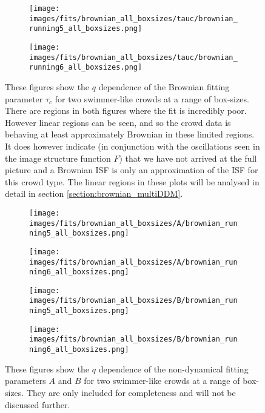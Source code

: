 \documentclass[10pt]{article}
\begin{document}
\begin{figure}[H]
\begin{subfigure}[t]{.5\textwidth}
  \centering
 \texttt{[image: images/fits/brownian\_all\_boxsizes/tauc/brownian\_running5\_all\_boxsizes.png]}
  \caption{}
\end{subfigure}%
\hfill
\begin{subfigure}[t]{.5\textwidth}
  \centering
  \texttt{[image: images/fits/brownian\_all\_boxsizes/tauc/brownian\_running6\_all\_boxsizes.png]}
  \caption{}
\end{subfigure}
\caption{These figures show the $q$ dependence of the Brownian fitting parameter $\tau_c$ for two swimmer-like crowds at a range of box-sizes. There are regions in both figures where the fit is incredibly poor. However linear regions can be seen, and so the crowd data is behaving at least approximately Brownian in these limited regions. It does however indicate (in conjunction with the oscillations seen in the image structure function $F$) that we have not arrived at the full picture and a Brownian ISF is only an approximation of the ISF for this crowd type. The linear regions in these plots will be analysed in detail in section \ref{section:brownian_multiDDM}.}
\label{fig:running_brownian_fits_tauc_all_boxsizes}
\end{figure}

\begin{figure}[H]
\begin{subfigure}[t]{.5\textwidth}
  \centering
 \texttt{[image: images/fits/brownian\_all\_boxsizes/A/brownian\_running5\_all\_boxsizes.png]}
  \caption{}
\end{subfigure}%
\hfill
\begin{subfigure}[t]{.5\textwidth}
  \centering
  \texttt{[image: images/fits/brownian\_all\_boxsizes/A/brownian\_running6\_all\_boxsizes.png]}
  \caption{}
\end{subfigure}
\label{fig:running_brownian_fits_A_all_boxsizes}
\par\bigskip
\begin{subfigure}[t]{.5\textwidth}
  \centering
 \texttt{[image: images/fits/brownian\_all\_boxsizes/B/brownian\_running5\_all\_boxsizes.png]}
  \caption{}
\end{subfigure}%
\hfill
\begin{subfigure}[t]{.5\textwidth}
  \centering
  \texttt{[image: images/fits/brownian\_all\_boxsizes/B/brownian\_running6\_all\_boxsizes.png]}
  \caption{}
\end{subfigure}
\caption{These figures show the $q$ dependence of the non-dynamical fitting parameters $A$ and $B$ for two swimmer-like crowds at a range of box-sizes. They are only included for completeness and will not be discussed further.}
\label{fig:running_brownian_fits_tauc_B_boxsizes}
\end{figure}
\clearpage
\end{document}
